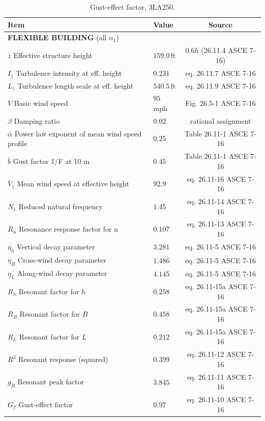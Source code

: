 \documentclass{simcenterdocumentation}
\newcommand{\ft}{\ensuremath{\,\mathrm{ft}}}
\begin{document}
\begin{table}[H]
\centering \caption{Gust-effect factor, 3LA250.}
\label{tab:gust_factor_20LA250}
\begin{tabular}{llc}
\toprule
Item		& Value		& Source		\\
\midrule
\multicolumn{3}{l}{\textbf{FLEXIBLE BUILDING} (all $n_1$)}	\\
$\bar{z}$ Effective structure height							& $159.0 \ft$					& $0.6h$ (26.11.4 ASCE 7-16)	\\
$I_{\bar{z}}$ Turbulence intensity at eff. height				& $0.231$						& eq. 26.11.7 ASCE 7-16			\\
$L_{\bar{z}}$ Turbulence length scale at eff. height			& $540.5 \ft$					& eq. 26.11.9 ASCE 7-16			\\
$V$ Basic wind speed											& $95$ mph						& Fig. 26.5-1 ASCE 7-16			\\
$\beta$ Damping ratio											& $0.02$						& rational assignment			\\
$\bar{\alpha}$ Power law exponent of mean wind speed profile	& $0.25$						& Table 26.11-1 ASCE 7-16		\\
$\bar{b}$ Gust factor 1/F at 10 m								& $0.45$						& Table 26.11-1 ASCE 7-16		\\
$\bar{V}_{\bar{z}}$ Mean wind speed at effective height			& $92.9$						& eq. 26.11-16 ASCE 7-16		\\
$N_1$ Reduced natural frequency									& $1.45$						& eq. 26.11-14 ASCE 7-16		\\
$R_n$ Resonance response factor for n							& $0.107$						& eq. 26.11-13 ASCE 7-16		\\
$\eta_h$ Vertical decay parameter								& $3.281$						& eq. 26.11-5 ASCE 7-16			\\
$\eta_B$ Cross-wind decay parameter								& $1.486$						& eq. 26.11-5 ASCE 7-16			\\
$\eta_L$ Along-wind decay parameter								& $4.145$						& eq. 26.11-5 ASCE 7-16			\\
$R_h$ Resonant factor for $h$									& $0.258$							& eq. 26.11-15a ASCE 7-16			\\
$R_B$ Resonant factor for $B$									& $0.458$							& eq. 26.11-15a ASCE 7-16			\\
$R_L$ Resonant factor for $L$									& $0.212$							& eq. 26.11-15a ASCE 7-16			\\
$R^2$ Resonant response (squared)								& $0.399$							& eq. 26.11-12 ASCE 7-16			\\
$g_R$ Resonant peak factor										& $3.845$							& eq. 26.11-11 ASCE 7-16			\\
$G_f$ Gust-effect factor										& $0.97$							& eq. 26.11-10 ASCE 7-16			\\
\bottomrule
\end{tabular}
\end{table}
\end{document}
